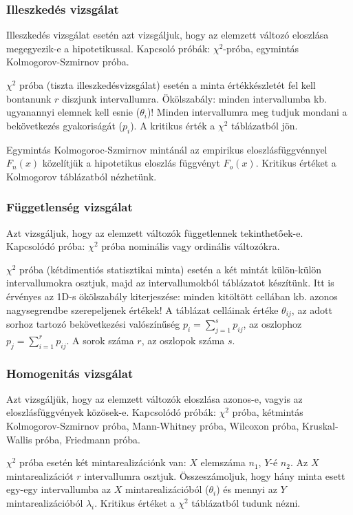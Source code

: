 \subsubsection{Illeszkedés vizsgálat}

Illeszkedés vizsgálat esetén azt vizsgáljuk, hogy az elemzett változó eloszlása megegyezik-e a hipotetikussal. Kapcsoló próbák: $\chi^2$-próba, egymintás Kolmogorov-Szmirnov próba.

$\chi^2$ próba (tiszta illeszkedésvizsgálat) esetén a minta értékkészletét fel kell bontanunk $r$ diszjunk intervallumra. Ökölszabály: minden intervallumba kb. ugyanannyi elemnek kell esnie ($\theta_i$)! Minden intervallumra meg tudjuk mondani a bekövetkezés gyakoriságát ($p_i$). A kritikus érték a $\chi^2$ táblázatból jön.

Egymintás Kolmogoroc-Szmirnov mintánál  az empirikus eloszlásfüggvénnyel $F_n(x)$ közelítjük a hipotetikus eloszlás függvényt $F_o(x)$. Kritikus értéket a Kolmogorov táblázatból nézhetünk.

\subsubsection{Függetlenség vizsgálat}

Azt vizsgáljuk, hogy az elemzett változók függetlennek tekinthetőek-e. Kapcsolódó próba: $\chi^2$ próba nominális vagy ordinális változókra.

$\chi^2$ próba (kétdimentiós statisztikai minta) esetén a két mintát külön-külön intervallumokra osztjuk, majd az intervallumokból táblázatot készítünk. Itt is érvényes az 1D-s ökölszabály kiterjeszése: minden kitöltött cellában kb. azonos nagysegrendbe szerepeljenek értékek! A táblázat celláinak értéke $\theta_{ij}$, az adott sorhoz tartozó bekövetkezési valószínűség $p_i = \sum_{j=1}^s p_{ij}$, az oszlophoz $p_j= \sum_{i=1}^r p_{ij}$. A sorok száma $r$, az oszlopok száma $s$.

\subsubsection{Homogenitás vizsgálat}

Azt vizsgáljük, hogy az elemzett változók eloszlása azonos-e, vagyis az eloszlásfüggvények közösek-e. Kapcsolódó próbák: $\chi^2$ próba, kétmintás Kolmogorov-Szmirnov próba, Mann-Whitney próba, Wilcoxon próba, Kruskal-Wallis próba, Friedmann próba.

$\chi^2$ próba esetén két mintarealizációnk van: $X$ elemszáma $n_1$, $Y$-é $n_2$. Az $X$ mintarealizációt $r$ intervallumra osztjuk. Összeszámoljuk, hogy hány minta esett egy-egy intervallumba az $X$ mintarealizációból ($\theta_i$) és mennyi az $Y$ mintarealizációból $\lambda_i$. Kritikus értéket a $\chi^2$ táblázatból tudunk nézni.

